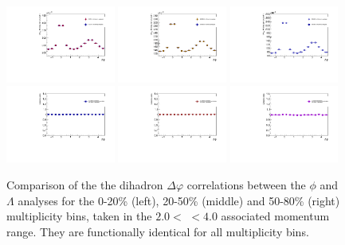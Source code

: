 \begin{figure}[ht]
    \includegraphics[width=0.32\textwidth]{figures/analysis/h_h_dphi_0_20_justin_ryan_comparison.pdf}
    \includegraphics[width=0.32\textwidth]{figures/analysis/h_h_dphi_20_50_justin_ryan_comparison.pdf}
    \includegraphics[width=0.32\textwidth]{figures/analysis/h_h_dphi_50_80_justin_ryan_comparison.pdf}
    \includegraphics[width=0.32\textwidth]{figures/analysis/justin_ryan_ratio_0_20}
    \includegraphics[width=0.32\textwidth]{figures/analysis/justin_ryan_ratio_20_50}
    \includegraphics[width=0.32\textwidth]{figures/analysis/justin_ryan_ratio_50_80}
    \caption{Comparison of the the dihadron $\Delta\varphi$ correlations between the $\phi$ and $\Lambda$ analyses for the 0-20\% (left), 20-50\% (middle) and 50-80\% (right) multiplicity bins, taken in the $2.0 <$ \pt $< 4.0$ \GeVc associated momentum range. They are functionally identical for all multiplicity bins.}
    \label{fig:dihadron_comp}
\end{figure}

